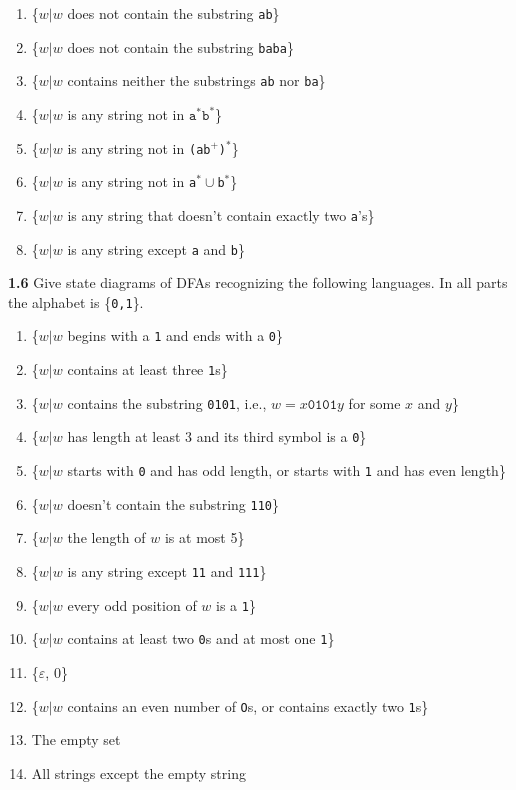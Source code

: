 \documentclass{article}
\begin{document}
\begin{enumerate}
\item \{$w|w$ does not contain the substring \texttt{ab}\}
\item \{$w|w$ does not contain the substring \texttt{baba}\}
\item \{$w|w$ contains neither the substrings \texttt{ab} nor \texttt{ba}\}
\item \{$w|w$ is any string not in $\texttt{a}^* \texttt{b}^*$\}
\item \{$w|w$ is any string not in \texttt{(ab$^+$)$^*$}\}
\item \{$w|w$ is any string not in \texttt{a$^*\cup$b$^*$}\}
\item \{$w|w$ is any string that doesn't contain exactly two \texttt{a}'s\}
\item \{$w|w$ is any string except \texttt{a} and \texttt{b}\}
\end{enumerate}

\textbf{1.6} Give state diagrams of DFAs recognizing the following languages. In
all parts the alphabet is \{\texttt{0,1}\}.

\begin{enumerate}
\item \{$w|w$ begins with a \texttt{1} and ends with a \texttt{0}\}
\item \{$w|w$ contains at least three \texttt{1}s\}
\item \{$w|w$ contains the substring \texttt{0101}, i.e., $w = x\texttt{0101}y$
for some $x$ and $y$\}
\item \{$w|w$ has length at least 3 and its third symbol is a \texttt{0}\}
\item \{$w|w$ starts with \texttt{0} and has odd length, or starts with
\texttt{1} and has even length\}
\item \{$w|w$ doesn't contain the substring \texttt{110}\}
\item \{$w|w$ the length of $w$ is at most 5\}
\item \{$w|w$ is any string except \texttt{11} and \texttt{111}\}
\item \{$w|w$ every odd position of $w$ is a \texttt{1}\}
\item \{$w|w$ contains at least two \texttt{0}s and at most one \texttt{1}\}
\item \{$\varepsilon$, $0$\}
\item \{$w|w$ contains an even number of \texttt{O}s, or contains exactly two
\texttt{1}s\}
\item The empty set
\item All strings except the empty string
\end{enumerate}
\end{document}
